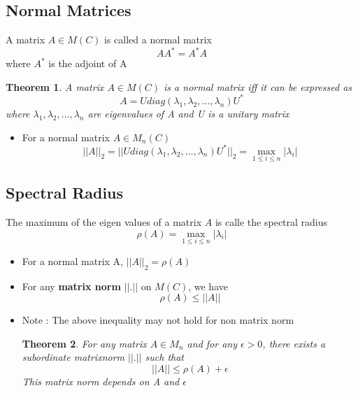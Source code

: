 \documentclass{article}
\newtheorem*{theorem}{Theorem}
\begin{document}
\subsection{Normal Matrices}
	A matrix $A\in M(C)$ is called a normal matrix
	\[AA^* = A^*A\]
	where $A^*$ is the adjoint of A 

	\begin{theorem}
		A matrix $A \in M(C)$ is a normal matrix iff it can be expressed as 
		\[A = U diag(\lambda_1,\lambda_2,\hdots,\lambda_n) U^*\]
		where $\lambda_1,\lambda_2,\hdots,\lambda_n$ are eigenvalues of A and U is a unitary matrix
	\end{theorem}

	\begin{itemize}
	\item For a normal matrix $A\in M_n(C)$
	\[||A||_2 = ||Udiag(\lambda_1,\lambda_2,\hdots,\lambda_n) U^*||_2 = \max_{1\leq i\leq n} |\lambda_i|\]
	\end{itemize}

\subsection{Spectral Radius}
	The maximum of the eigen values of a matrix $A$ is calle the spectral radius
		\[\rho(A) = \max_{1\leq i\leq n} |\lambda_i|\]

	\begin{itemize}
	\item For a normal matrix A, $||A||_2 = \rho(A)$
	\item For any \textbf{matrix norm} $||.||$ on $M(C)$, we have
		\[\rho(A)\leq ||A||\]

	\item Note : The above inequality may not hold for non matrix norm

	\begin{theorem}
	For any matrix $A\in M_n$ and for any $\epsilon > 0$, there exists a subordinate matrixnorm $||.||$ such that
		\[||A|| \leq \rho(A) + \epsilon\]
	This matrix norm depends on A and $\epsilon$
	\end{theorem}

	\end{itemize}
\end{document}
